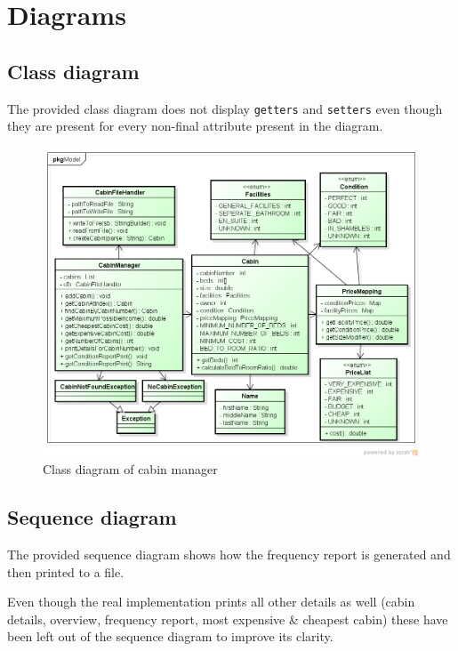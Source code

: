 \chapter{Diagrams}\label{ch:diagrams}

\section{Class diagram}
\label{sec:class_diagram}

The provided class diagram does not display \texttt{getters} and \texttt{setters} even though they are present for every non-final attribute present in the diagram.

\begin{figure}[H]
  \begin{center}
    \includegraphics[width=\textwidth]{gfx/class_diagram.png}
  \caption{Class diagram of cabin manager}
  \end{center}
\end{figure}

\section{Sequence diagram}
\label{sec:sequence_diagram}

The provided sequence diagram shows how the frequency report is generated and then printed to a file.

Even though the real implementation prints all other details as well (cabin details, overview, frequency report, most expensive \& cheapest cabin) these have been left out of the sequence diagram to improve its clarity.

